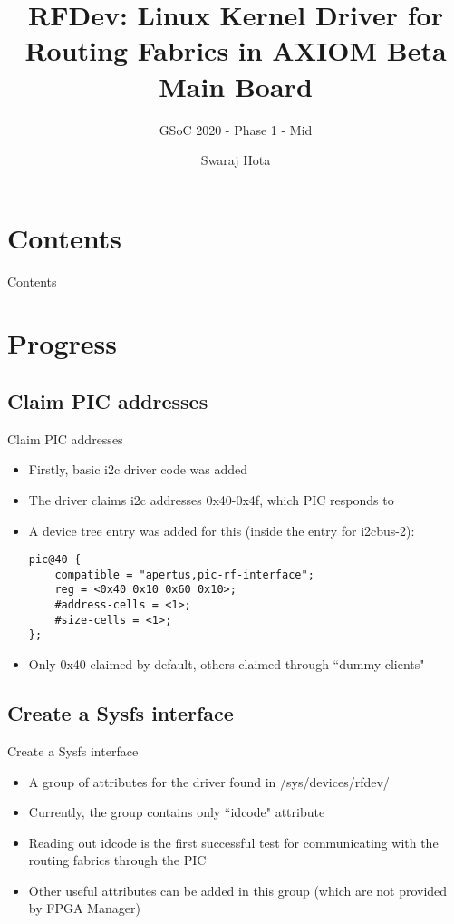 \documentclass{beamer}
\title{RFDev: Linux Kernel Driver for Routing Fabrics in AXIOM Beta Main Board}
\subtitle{GSoC 2020 - Phase 1 - Mid}
\author{Swaraj Hota}
\date
\begin{document}
{
	\frame{\titlepage}
}

\section*{Contents}

\begin{frame}{Contents}
	\tableofcontents
\end{frame}

\section{Progress}

\subsection{Claim PIC addresses}

\begin{frame}[fragile]{Claim PIC addresses}
\begin{itemize}
\item Firstly, basic i2c driver code was added
\item The driver claims i2c addresses 0x40-0x4f, which PIC responds to
\item A device tree entry was added for this (inside the entry for i2cbus-2):
\begin{verbatim}
pic@40 {
	compatible = "apertus,pic-rf-interface";
	reg = <0x40 0x10 0x60 0x10>;
	#address-cells = <1>;
	#size-cells = <1>;
};
\end{verbatim}
\item Only 0x40 claimed by default, others claimed through ``dummy clients"
\end{itemize}
\end{frame}

\subsection{Create a Sysfs interface}

\begin{frame}{Create a Sysfs interface}
\begin{itemize}
\item A group of attributes for the driver found in /sys/devices/rfdev/
\item Currently, the group contains only ``idcode" attribute
\item Reading out idcode is the first successful test for communicating with
	the routing fabrics through the PIC
\item Other useful attributes can be added in this group (which are not provided
	by FPGA Manager)
\end{itemize}
\end{frame}
\end{document}
